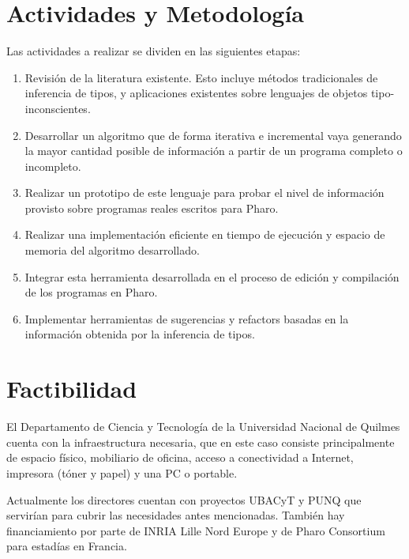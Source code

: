 \documentclass[a4paper,10pt]{article}
\begin{document}
\section{Actividades y Metodología}

Las actividades a realizar se dividen en las siguientes etapas:

  \begin{enumerate}
   \item Revisión de la literatura existente. Esto incluye métodos tradicionales de inferencia de tipos, y aplicaciones existentes sobre lenguajes de objetos tipo-inconscientes.
   \item Desarrollar un algoritmo que de forma iterativa e incremental vaya generando la mayor cantidad posible de información a partir de un programa completo o incompleto.
   \item Realizar un prototipo de este lenguaje para probar el nivel de información provisto sobre programas reales escritos para Pharo.
   \item Realizar una implementación eficiente en tiempo de ejecución y espacio de memoria del algoritmo desarrollado.
   \item Integrar esta herramienta desarrollada en el proceso de edición y compilación de los programas en Pharo.
   \item Implementar herramientas de sugerencias y refactors basadas en la información obtenida por la inferencia de tipos.
  \end{enumerate}


\section{Factibilidad}

El Departamento de Ciencia y Tecnología de la Universidad Nacional de Quilmes cuenta con la infraestructura necesaria, que en este caso consiste principalmente de espacio físico, mobiliario de oficina, acceso a conectividad a Internet, impresora (tóner y papel) y una PC o portable.

Actualmente los directores cuentan con proyectos UBACyT y PUNQ que servirían para cubrir las necesidades antes mencionadas. 
También hay financiamiento por parte de INRIA Lille Nord Europe y de Pharo Consortium para estadías en Francia.



\end{document}
